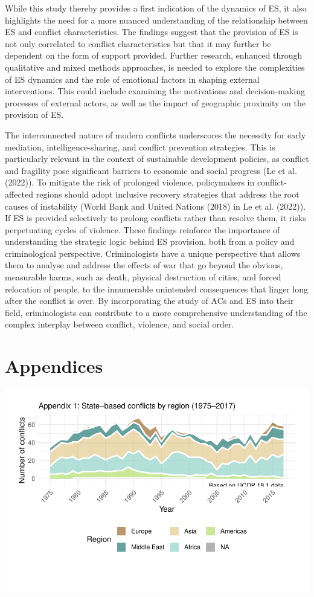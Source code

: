 \documentclass[
]{article}
\begin{document}
While this study thereby provides a first indication of the dynamics of
ES, it also highlights the need for a more nuanced understanding of the
relationship between ES and conflict characteristics. The findings
suggest that the provision of ES is not only correlated to conflict
characteristics but that it may further be dependent on the form of
support provided. Further research, enhanced through qualitative and
mixed methods approaches, is needed to explore the complexities of ES
dynamics and the role of emotional factors in shaping external
interventions. This could include examining the motivations and
decision-making processes of external actors, as well as the impact of
geographic proximity on the provision of ES.

The interconnected nature of modern conflicts underscores the necessity
for early mediation, intelligence-sharing, and conflict prevention
strategies. This is particularly relevant in the context of sustainable
development policies, as conflict and fragility pose significant
barriers to economic and social progress (Le et al. (2022)). To mitigate
the risk of prolonged violence, policymakers in conflict-affected
regions should adopt inclusive recovery strategies that address the root
causes of instability (World Bank and United Nations (2018) in Le et al.
(2022)). If ES is provided selectively to prolong conflicts rather than
resolve them, it risks perpetuating cycles of violence. These findings
reinforce the importance of understanding the strategic logic behind ES
provision, both from a policy and criminological perspective.
Criminologists have a unique perspective that allows them to analyse and
address the effects of war that go beyond the obvious, measurable harms,
such as death, physical destruction of cities, and forced relocation of
people, to the innumerable unintended consequences that linger long
after the conflict is over. By incorporating the study of ACs and ES
into their field, criminologists can contribute to a more comprehensive
understanding of the complex interplay between conflict, violence, and
social order.

\section{Appendices}\label{appendices}

\includegraphics{Dissertation_writeup_files/figure-latex/Region (Appendix 1)-1.pdf}
\end{document}
